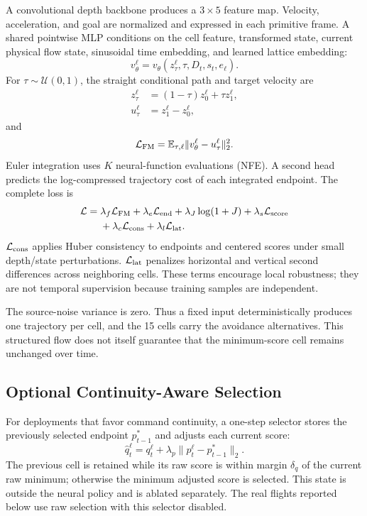 A convolutional depth backbone produces a $3\times5$ feature map. Velocity, acceleration, and goal are normalized and expressed in each primitive frame. A shared pointwise MLP conditions on the cell feature, transformed state, current physical flow state, sinusoidal time embedding, and learned lattice embedding:
\begin{equation}
 v_\theta^\ell=v_\theta(z_\tau^\ell,\tau,D_t,s_t,e_\ell).
\end{equation}
For $\tau\sim\mathcal U(0,1)$, the straight conditional path and target velocity are
\begin{align}
 z_\tau^\ell&=(1-\tau)z_0^\ell+\tau z_1^\ell,\\
 u_\tau^\ell&=z_1^\ell-z_0^\ell,
\end{align}
and
\begin{equation}
 \mathcal L_{\rm FM}=\mathbb E_{\tau,\ell}
 \lVert v_\theta^\ell-u_\tau^\ell\rVert_2^2.
 \label{eq:fm}
\end{equation}
Euler integration uses $K$ neural-function evaluations (NFE). A second head predicts the log-compressed trajectory cost of each integrated endpoint. The complete loss is
\begin{align}
 \mathcal L={}&\lambda_f\mathcal L_{\rm FM}+\lambda_e\mathcal L_{\rm end}
 +\lambda_J\log(1+J)+\lambda_s\mathcal L_{\rm score}\nonumber\\
 &+\lambda_c\mathcal L_{\rm cons}+\lambda_l\mathcal L_{\rm lat}.
 \label{eq:total-loss}
\end{align}
$\mathcal L_{\rm cons}$ applies Huber consistency to endpoints and centered scores under small depth/state perturbations. $\mathcal L_{\rm lat}$ penalizes horizontal and vertical second differences across neighboring cells. These terms encourage local robustness; they are not temporal supervision because training samples are independent.

The source-noise variance is zero. Thus a fixed input deterministically produces one trajectory per cell, and the 15 cells carry the avoidance alternatives. This structured flow does not itself guarantee that the minimum-score cell remains unchanged over time.

\subsection{Optional Continuity-Aware Selection}

For deployments that favor command continuity, a one-step selector stores the previously selected endpoint $p_{t-1}^{*}$ and adjusts each current score:
\begin{equation}
 \hat q_t^\ell=q_t^\ell+\lambda_p\lVert p_t^\ell-p_{t-1}^{*}\rVert_2.
\end{equation}
The previous cell is retained while its raw score is within margin $\delta_q$ of the current raw minimum; otherwise the minimum adjusted score is selected. This state is outside the neural policy and is ablated separately. The real flights reported below use raw selection with this selector disabled.
